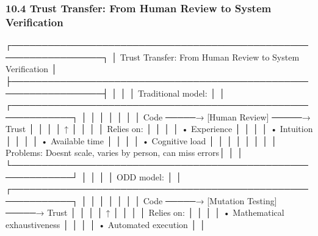 \documentclass[
]{article}
\newenvironment{Shaded}{}{}
\newcommand{\NormalTok}[1]{#1}
\begin{document}
\hypertarget{104-trust-transfer-from-human-review-to-system-verification}{%
\subsubsection{10.4 Trust Transfer: From Human Review to System
Verification}\label{104-trust-transfer-from-human-review-to-system-verification}}

\begin{Shaded}
\begin{Highlighting}[]
\NormalTok{┌─────────────────────────────────────────────────────────────────┐}
\NormalTok{│    Trust Transfer: From Human Review to System Verification      │}
\NormalTok{├─────────────────────────────────────────────────────────────────┤}
\NormalTok{│                                                                  │}
\NormalTok{│  Traditional model:                                             │}
\NormalTok{│  ┌────────────────────────────────────────────────────────────┐ │}
\NormalTok{│  │                                                            │ │}
\NormalTok{│  │  Code ─────→ [Human Review] ─────→ Trust                  │ │}
\NormalTok{│  │                    ↑                                       │ │}
\NormalTok{│  │              Relies on:                                    │ │}
\NormalTok{│  │              • Experience                                  │ │}
\NormalTok{│  │              • Intuition                                   │ │}
\NormalTok{│  │              • Available time                              │ │}
\NormalTok{│  │              • Cognitive load                              │ │}
\NormalTok{│  │                                                            │ │}
\NormalTok{│  │  Problems: Doesn\textquotesingle{}t scale, varies by person, can miss errors│ │}
\NormalTok{│  └────────────────────────────────────────────────────────────┘ │}
\NormalTok{│                                                                  │}
\NormalTok{│  ODD model:                                                     │}
\NormalTok{│  ┌────────────────────────────────────────────────────────────┐ │}
\NormalTok{│  │                                                            │ │}
\NormalTok{│  │  Code ─────→ [Mutation Testing] ─────→ Trust              │ │}
\NormalTok{│  │                    ↑                                       │ │}
\NormalTok{│  │              Relies on:                                    │ │}
\NormalTok{│  │              • Mathematical exhaustiveness                 │ │}
\NormalTok{│  │              • Automated execution                         │ │}

\end{Highlighting}
\end{Shaded}
\end{document}
